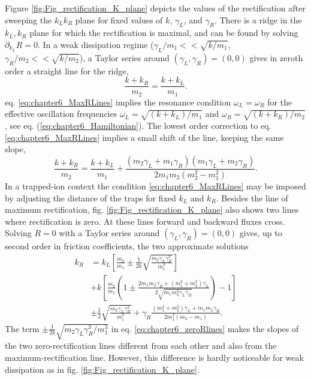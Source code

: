 Figure \ref{fig:Fig_rectification_K_plane} depicts the values of the rectification after sweeping the $k_L k_R$ plane for fixed values of $k$, $\gamma_L$, and $\gamma_R$. There is a ridge in the $k_L,k_R$ plane for which the rectification is maximal, and can be found by solving $\partial_{k_L}R = 0$. In a weak dissipation regime
(${\gamma_L}/{m_1}<<\sqrt{{k}/{m_1}}$, ${\gamma_R}/{m_2}<<\sqrt{{k}/{m_2}}$), a Taylor series around $(\gamma_L,\gamma_R) = (0,0)$ gives in zeroth order a straight line for the ridge,
%
\begin{equation}
  \frac{k+k_R}{m_2} = \frac{k+k_L}{m_1}.
  \label{eq:chapter6_MaxRLines}
\end{equation}
%
eq. \eqref{eq:chapter6_MaxRLines} implies the resonance condition $\omega_L = \omega_R$
for the effective oscillation frequencies $\omega_L = \sqrt{{(k+k_L)}/{m_1}}$ and $\omega_R = \sqrt{{(k+k_R)}/{m_2}}$,
see eq. (\ref{eq:chapter6_Hamiltonian}). The lowest order correction to  eq. \eqref{eq:chapter6_MaxRLines} implies a small shift of the line,
keeping the same slope,
%
\begin{equation}
  \frac{k+k_R}{m_2} = \frac{k+k_L}{m_1} + \frac{(m_2\gamma_L+m_1\gamma_R)(m_1\gamma_L+m_2\gamma_R)}{2m_1m_2(m_2^2-m_1^2)}.
  \label{eq:chapter6_MaxRLines_correction}
\end{equation}
%
In a trapped-ion context the condition \eqref{eq:chapter6_MaxRLines} may be imposed by adjusting the distance of the traps for fixed $k_L$ and $k_R$. Besides the line of maximum rectification, fig. \ref{fig:Fig_rectification_K_plane} also shows two lines where rectification is zero.
At these lines forward and backward fluxes cross.
Solving $R=0$ with a Taylor series around $(\gamma_L,\gamma_R) = (0,0)$ gives, up to second order in friction coefficients,  the two approximate solutions
%
\begin{align}
k_R &= k_L\left[\frac{m_2}{m_1}\pm\frac{1}{2k}\sqrt{\frac{m_2\gamma_L\gamma_R^3}{m_1^3}}\right]
\nonumber\\
&+k\left[\frac{m_2}{m_1}\left(1\pm \frac{ 2 m_1 m_2 \gamma_R + (m_1^2 + m_2^2)\gamma_L }{2\sqrt{m_1 m_2^3 \gamma_L \gamma_R}} \right)-1\right]
\nonumber\\
&\pm\frac{1}{2}\sqrt{\frac{m_2\gamma_L\gamma_R^3}{m_1^3}} + \gamma_R\frac{(m_1^2+m_2^2)\gamma_L + m_1m_2\gamma_R}{2m_1^2(m_2-m_1)}.
\label{eq:chapter6_zeroRlines}
\end{align}
%
The term $\pm\frac{1}{2k}\sqrt{{m_2\gamma_L\gamma_R^3}/{m_1^3}}$ in eq. \eqref{eq:chapter6_zeroRlines} makes the slopes of the
two zero-rectification lines different from each other and also from the maximum-rectification line. However, this difference is hardly noticeable for weak dissipation as in  fig. \ref{fig:Fig_rectification_K_plane}.


